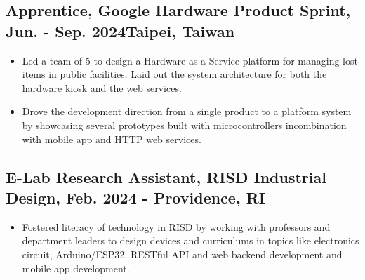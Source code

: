 \documentclass[12pt]{article}
\begin{document}
    \subsection*{Apprentice, Google Hardware Product Sprint, Jun. - Sep. 2024\hfill Taipei, Taiwan}
        { \small
        \begin{itemize}
            \item Led a team of 5 to design a Hardware as a Service platform for managing lost items in public facilities. Laid out the system architecture for both the hardware kiosk and the web services.
            \item Drove the development direction from a single product to a platform system by showcasing several prototypes built with microcontrollers incombination with mobile app and HTTP web services.
        \end{itemize}
        }
    \subsection*{E-Lab Research Assistant, RISD Industrial Design, Feb. 2024 -  \hfill Providence, RI}
        { \small
        \begin{itemize}
            \item Fostered literacy of technology in RISD by working with professors and department leaders to design devices and curriculums in topics like electronics circuit, Arduino/ESP32, RESTful API and web backend development and mobile app development.
        \end{itemize}
        }
\end{document}
